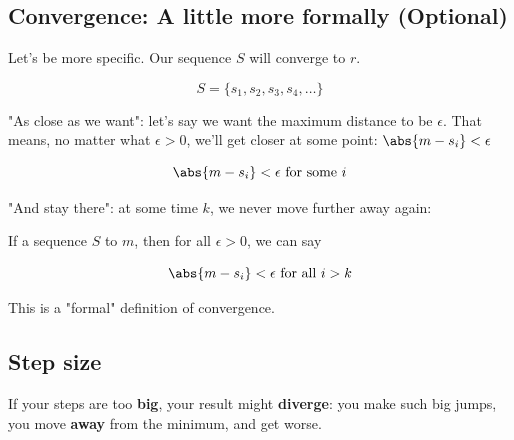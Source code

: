    \subsection{Convergence: A little more formally (Optional)}
        
        Let's be more specific. Our sequence $S$ will converge to $r$.
        
        \begin{equation}
            S = \{ s_1, s_2, s_3, s_4, \dots \} 
        \end{equation}
        
        "As close as we want": let's say we want the maximum distance to be $\epsilon$. That means, no matter what $\epsilon>0$, we'll get closer at some point: $\abs{m-s_i}<\epsilon$
        
        \begin{equation}
            \abs{m-s_i}<\epsilon \text{ for some } i
        \end{equation}
        
        "And stay there": at some time $k$, we never move further away again:\\
        
        \begin{definition}
            If a sequence $S$  to $m$, then for all $\epsilon>0$, we can say
            
            \begin{equation}
                \abs{m-s_i}<\epsilon \text{ for all } i>k
            \end{equation}
        
        \end{definition}
        
        This is a "formal" definition of convergence.
        
    
    \subsection{Step size}
    
        If your steps are too \textbf{big}, your result might \textbf{diverge}: you make such big jumps, you move \textbf{away} from the minimum, and get worse.
        
